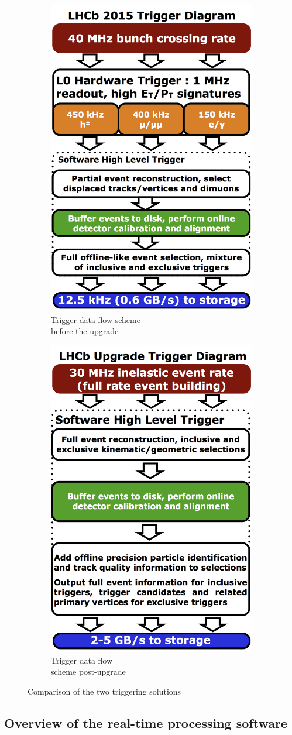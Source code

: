 \documentclass[12pt]{article}
\begin{document}
\begin{figure}[H]
	\centering
	\begin{subfigure}{.5\textwidth}
		\centering
		\includegraphics[width=.4\linewidth]{LHCb_Trigger_RunII_May2015}
		\caption{Trigger data flow scheme\\ before the upgrade}
		\label{fig:sub1}
	\end{subfigure}%
	\begin{subfigure}{.5\textwidth}
		\centering
		\includegraphics[width=.4\linewidth]{LHCb_Trigger_RunIII_May2015}
		\caption{Trigger data flow\\ scheme post-upgrade}
		\label{fig:sub2}
	\end{subfigure}
	\caption{Comparison of the two triggering solutions}
	\label{fig_trigger_compare}
\end{figure}


\subsection{Overview of the real-time processing software}\label{sec_reco_sw_overview}
	
\end{document}
